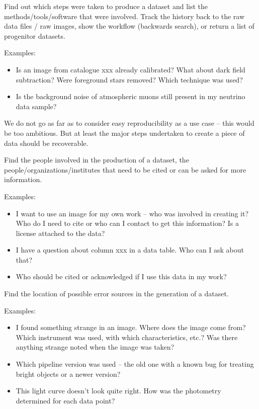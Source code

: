        Find out which steps were taken to produce a dataset and list the
        methods\slash{}tools\slash{}software that were involved. Track the
        history back to the raw data files \slash{} raw images, show the
        workflow (backwards search), or return a list of progenitor datasets.

        \noindent Examples: 
        \begin{itemize}
            \item Is an image from catalogue xxx already calibrated?
What about dark field subtraction? Were foreground stars removed? Which technique
was used?  
            \item Is the background noise of atmospheric muons still present in my neutrino data sample?  
        \end{itemize}

        We do not go as far as to consider easy reproducibility as a use case -- this would be too ambitious. But at least the 
        major steps undertaken to create a piece of data should be recoverable.


        Find the people involved in the production of a dataset,
        the people\slash{}organizations\slash{}institutes that need to be cited
        or can be asked for more information.

        \noindent Examples: 
        \begin{itemize}
            \item I want to use an image for my own work -- who was involved in
creating it? Who do I need to cite or who can I contact to get this information? Is a license attached to the data? 
            \item I have a question about column xxx in a data
table. Who can I ask about that?  
            \item Who should be cited or acknowledged if I use this data in my work?
        \end{itemize}


        Find the location of possible error sources in the generation of a dataset.

        \noindent Examples:
        \begin{itemize}
            \item I found something strange in an image. Where does
the image come from? Which instrument was used, with which characteristics,
etc.? Was there anything strange noted when the image was taken?  
            \item Which pipeline version was used -- the old one
with a known bug for treating bright objects or a newer version?  
            \item This light curve doesn't look quite right. How was
the photometry determined for each data point?  
        \end{itemize}



